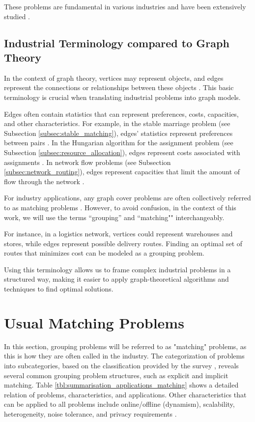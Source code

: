     
    
    These problems are fundamental in various industries and have been extensively studied \cite{manlove2013algorithmics}.


    \subsection{Industrial Terminology compared to Graph Theory}
    
   In the context of graph theory, vertices may represent objects, and edges represent the connections or relationships between these objects \cite{west2001introduction, diestel2017graph}. 
    This basic terminology is crucial when translating industrial problems into graph models.

    Edges often contain statistics that can represent preferences, costs, capacities, and other characteristics.
    For example, in the stable marriage problem  (see Subsection \ref{subsec:stable_matching}), edges' statistics represent preferences between pairs \cite{gale1962college}.
    In the Hungarian algorithm for the assignment problem  (see Subsection \ref{subsec:resource_allocation}), edges represent costs associated with assignments \cite{kuhn1955hungarian}. 
    In network flow problems (see Subsection \ref{subsec:network_routing}), edges represent capacities that limit the amount of flow through the network \cite{ford1956maximal}.
    
    For industry applications, any graph cover problems are often collectively referred to as matching problems \cite{larman2004applying, fowler2003patterns}. However, to avoid confusion, in the context of this work, we will use the terms ``grouping'' and ``matching"" interchangeably.

    For instance, in a logistics network, vertices could represent warehouses and stores, while edges represent possible delivery routes. 
    Finding an optimal set of routes that minimizes cost can be modeled as a grouping problem.

    Using this terminology allows us to frame complex industrial problems in a structured way, making it easier to apply graph-theoretical algorithms and techniques to find optimal solutions.
    
    
    \section{Usual Matching Problems}
        
        In this section, grouping problems will be referred to as "matching" problems, as this is how they are often called in the industry. The categorization of problems into subcategories, based on the classification provided by the survey \cite{ieee_survey}, reveals several common grouping problem structures, such as explicit and implicit matching. Table \ref{tbl:summarisation_applications_matching} shows a detailed relation of problems, characteristics, and applications. Other characteristics that can be applied to all problems include online/offline (dynamism), scalability, heterogeneity, noise tolerance, and privacy requirements \cite{ieee_survey}.
        
